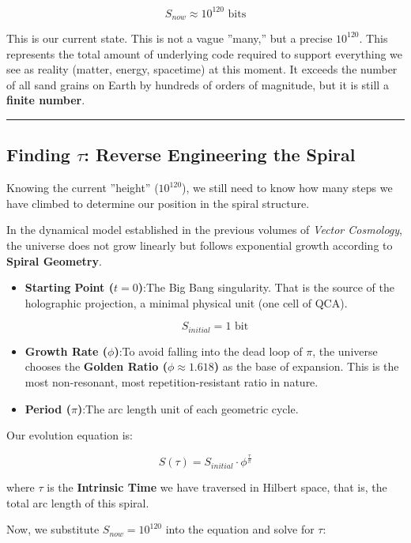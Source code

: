 \textbf{$$S_{now} \approx 10^{120} \text{ bits}$$}

This is our current state. This is not a vague ''many,'' but a precise \textbf{$10^{120}$}. This represents the total amount of underlying code required to support everything we see as reality (matter, energy, spacetime) at this moment. It exceeds the number of all sand grains on Earth by hundreds of orders of magnitude, but it is still a \textbf{finite number}.

\hrule

\subsection{Finding $\tau$: Reverse Engineering the Spiral}

Knowing the current ''height'' ($10^{120}$), we still need to know how many steps we have climbed to determine our position in the spiral structure.

In the dynamical model established in the previous volumes of \textit{Vector Cosmology}, the universe does not grow linearly but follows exponential growth according to \textbf{Spiral Geometry}.

\begin{itemize}
\item \textbf{Starting Point ($t=0$)}:The Big Bang singularity. That is the source of the holographic projection, a minimal physical unit (one cell of QCA).

    $$S_{initial} = 1 \text{ bit}$$

\item \textbf{Growth Rate ($\phi$)}:To avoid falling into the dead loop of $\pi$, the universe chooses the \textbf{Golden Ratio ($\phi \approx 1.618$)} as the base of expansion. This is the most non-resonant, most repetition-resistant ratio in nature.

\item \textbf{Period ($\pi$)}:The arc length unit of each geometric cycle.
\end{itemize}

Our evolution equation is:

$$S(\tau) = S_{initial} \cdot \phi^{\frac{\tau}{\pi}}$$

where \textbf{$\tau$} is the \textbf{Intrinsic Time} we have traversed in Hilbert space, that is, the total arc length of this spiral.

Now, we substitute $S_{now} = 10^{120}$ into the equation and solve for $\tau$:

